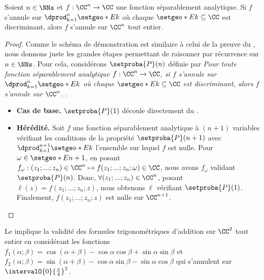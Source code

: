 \begin{fact} \label{sep-isolated-zero}
    Soient $n \in \NNs$
    et
    $f: \CC^n \rightarrow \CC$ une fonction séparablement analytique.
	Si $f$ s'annule sur $\dprod_{k=1}^{n} \setgeo*{E}{k}$ où chaque $\setgeo*{E}{k} \subseteq \CC$ est discriminant,
	alors $f$ s'annule sur $\CC^n$ tout entier. 
\end{fact}


\begin{proof}
	Comme le schéma de démonstration est similaire à celui de la preuve du ,
	nous donnons juste les grandes étapes permettant de raisonner par récurrence sur $n \in \NNs$.
	Pour cela, considérons $\setproba{P}(n)$ définie par
	\emph{\og 
		Pour toute fonction séparablement analytique $f: \CC^n \rightarrow \CC$,
		si $f$ s'annule sur $\dprod_{k=1}^{n} \setgeo*{E}{k}$ où chaque $\setgeo*{E}{k} \subseteq \CC$ est discriminant,
		alors $f$ s'annule sur $\CC^n$. 
	\fg}\kern2pt.
	\begin{itemize}[label=\small\textbullet]
		\item \textbf{Cas de base.}
		$\setproba{P}(1)$ découle directement du .


		\item \textbf{Hérédité.}
		Soit $f$ une fonction séparablement analytique à $(n + 1)$ variables vérifiant les conditions de la propriété $\setproba{P}(n + 1)$
		avec
		$\dprod_{k=1}^{n+1} \setgeo*{E}{k}$ l'ensemble sur lequel $f$ est nulle.
		Pour $\omega \in \setgeo*{E}{n+1}$,
		en posant
		$f_\omega: (z_1 ; ... ; z_n) \in \CC^n \mapsto f(z_1 ; ... ; z_n ; \omega) \in \CC$,
		nous avons $f_\omega$ validant $\setproba{P}(n)$.
		Donc, $\forall (z_1 ; ... ; z_n) \in \CC^n$,
		posant $\ell(z) = f(z_1 ; ... ; z_n ; z)$,
		nous obtenons $\ell$ vérifiant $\setproba{P}(1)$.
		Finalement,
		$f(z_1 ; ... ; z_n ; z)$ est nulle sur $\CC^{n+1}$.
	\end{itemize}

	\null\vspace{-6ex}
\end{proof}




\begin{example}
    Le  implique la validité des formules trigonométriques d'addition sur $\CC^2$ tout entier en considérant les fonctions
    $f_1(\alpha ; \beta) = \cos(\alpha + \beta) - \cos \alpha \cos \beta + \sin \alpha \sin \beta$
    et
    $f_2(\alpha ; \beta) = \sin(\alpha + \beta) - \cos \alpha \sin \beta - \sin \alpha \cos \beta$
    qui s'annulent sur $\intervalO{0}{\frac{\pi}{4}}^2$.
\end{example}


